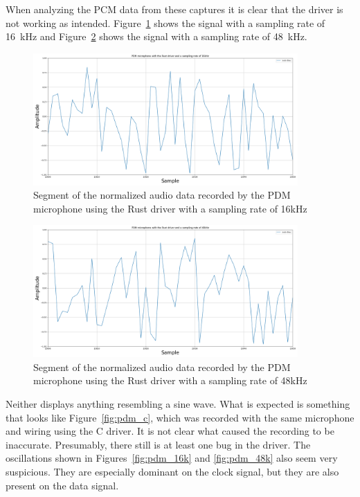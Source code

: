 When analyzing the PCM data from these captures it is clear that the driver is not working as intended.
Figure~\ref{fig:pdm_rust_16k} shows the signal with a sampling rate of \SI{16}{\kilo\hertz} and
Figure~\ref{fig:pdm_rust_48k} shows the signal with a sampling rate of \SI{48}{\kilo\hertz}.

\begin{figure}[H]
    \centering
    \includegraphics[width=0.9\textwidth]{figures/pdm/pdm_rust_16k.png}
    \caption[Segment of the normalized audio data recorded by the PDM microphone using the Rust driver with a sampling rate of 16kHz]
    {Segment of the normalized audio data recorded by the PDM microphone using the Rust driver with a sampling rate of 16kHz}
    \label{fig:pdm_rust_16k}
\end{figure}

\begin{figure}[H]
    \centering
    \includegraphics[width=0.9\textwidth]{figures/pdm/pdm_rust_48k.png}
    \caption[Segment of the normalized audio data recorded by the PDM microphone using the Rust driver with a sampling rate of 48kHz]
    {Segment of the normalized audio data recorded by the PDM microphone using the Rust driver with a sampling rate of 48kHz}
    \label{fig:pdm_rust_48k}
\end{figure}

Neither displays anything resembling a sine wave.
What is expected is something that looks like Figure~\ref{fig:pdm_c}, which was recorded with the same microphone and wiring using the C driver.
It is not clear what caused the recording to be inaccurate.
Presumably, there still is at least one bug in the driver.
The oscillations shown in Figures~\ref{fig:pdm_16k} and \ref{fig:pdm_48k} also seem very suspicious.
They are especially dominant on the clock signal, but they are also present on the data signal.

